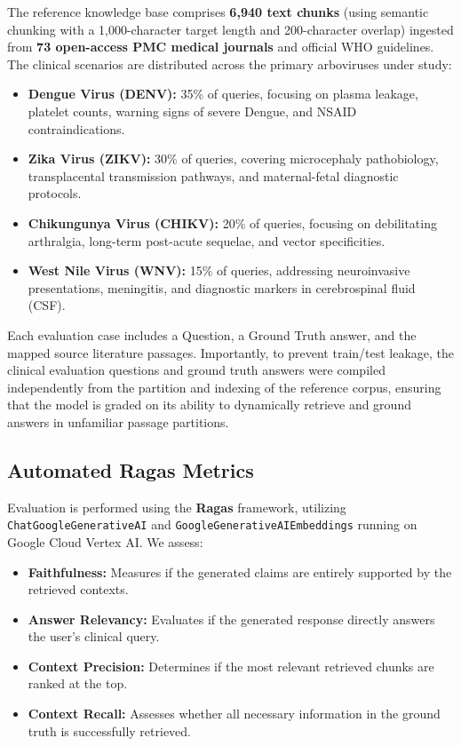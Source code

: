 \documentclass[sn-mathphys,Numbered]{sn-jnl}%
\begin{document}
The reference knowledge base comprises \textbf{6,940 text chunks} (using semantic chunking with a 1,000-character target length and 200-character overlap) ingested from \textbf{73 open-access PMC medical journals} and official WHO guidelines. The clinical scenarios are distributed across the primary arboviruses under study:
\begin{itemize}
    \item \textbf{Dengue Virus (DENV):} 35\% of queries, focusing on plasma leakage, platelet counts, warning signs of severe Dengue, and NSAID contraindications.
    \item \textbf{Zika Virus (ZIKV):} 30\% of queries, covering microcephaly pathobiology, transplacental transmission pathways, and maternal-fetal diagnostic protocols.
    \item \textbf{Chikungunya Virus (CHIKV):} 20\% of queries, focusing on debilitating arthralgia, long-term post-acute sequelae, and vector specificities.
    \item \textbf{West Nile Virus (WNV):} 15\% of queries, addressing neuroinvasive presentations, meningitis, and diagnostic markers in cerebrospinal fluid (CSF).
\end{itemize}

Each evaluation case includes a Question, a Ground Truth answer, and the mapped source literature passages. Importantly, to prevent train/test leakage, the clinical evaluation questions and ground truth answers were compiled independently from the partition and indexing of the reference corpus, ensuring that the model is graded on its ability to dynamically retrieve and ground answers in unfamiliar passage partitions.

\subsection{Automated Ragas Metrics}
Evaluation is performed using the \textbf{Ragas} framework, utilizing \texttt{ChatGoogleGenerativeAI} and \texttt{GoogleGenerativeAIEmbeddings} running on Google Cloud Vertex AI. We assess:
\begin{itemize}
    \item \textbf{Faithfulness:} Measures if the generated claims are entirely supported by the retrieved contexts.
    \item \textbf{Answer Relevancy:} Evaluates if the generated response directly answers the user's clinical query.
    \item \textbf{Context Precision:} Determines if the most relevant retrieved chunks are ranked at the top.
    \item \textbf{Context Recall:} Assesses whether all necessary information in the ground truth is successfully retrieved.
\end{itemize}
\end{document}
